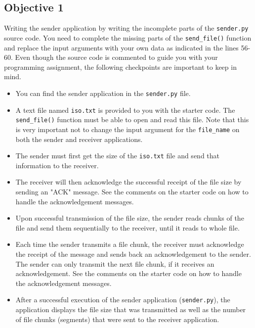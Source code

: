\documentclass[11pt]{article}
\begin{document}

\subsection{Objective 1}
\label{subsec:obj1}
Writing the sender application by writing the incomplete parts of the \texttt{sender.py} source code. You need to complete the missing parts of the \texttt{send\_file()} function and replace the input arguments with your own data as indicated in the lines 56-60. Even though the source code is commented to guide you with your programming assignment, the following checkpoints are important to keep in mind.
\begin{itemize}
    \item You can find the sender application in the \texttt{sender.py} file.
    \item A text file named \texttt{iso.txt} is provided to you with the starter code. The \texttt{send\_file()} function must be able to open and read this file. Note that this is very important not to change the input argument for the \texttt{file\_name} on both the sender and receiver applications.
    \item The sender must first get the size of the \texttt{iso.txt} file and send that information to the receiver.
    \item The receiver will then acknowledge the successful receipt of the file size by sending an "ACK" message. See the comments on the starter code on how to handle the acknowledgement messages.
    \item Upon successful transmission of the file size, the sender reads chunks of the file and send them sequentially to the receiver, until it reads to whole file.
    \item Each time the sender transmits a file chunk, the receiver must acknowledge the receipt of the message and sends back an acknowledgement to the sender. The sender can only transmit the next file chunk, if it receives an acknowledgement. See the comments on the starter code on how to handle the acknowledgement messages.
    \item After a successful execution of the sender application (\texttt{sender.py}), the application displays the file size that was transmitted as well as the number of file chunks (segments) that were sent to the receiver application.
\end{itemize}
\end{document}
